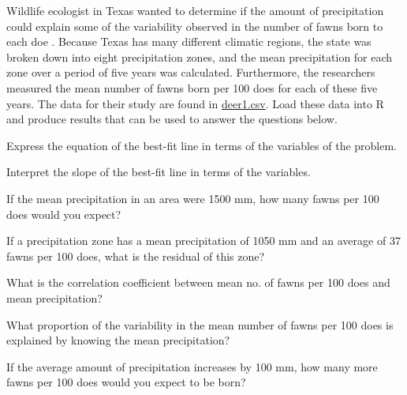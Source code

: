 \documentclass[10pt,openany]{book}\usepackage[]{graphicx}\usepackage[]{color}
\begin{document}
\begin{exsection}
  \item \label{revex:RegFawns} \rhw{} Wildlife ecologist in Texas wanted to determine if the amount of precipitation could explain some of the variability observed in the number of fawns born to each doe \citep{GinnettYoung2000}.  Because Texas has many different climatic regions, the state was broken down into eight precipitation zones, and the mean precipitation for each zone over a period of five years was calculated.  Furthermore, the researchers measured the mean number of fawns born per 100 does for each of these five years.  The data for their study are found in \href{https://raw.githubusercontent.com/droglenc/NCData/master/Deer1.csv}{deer1.csv}.  Load these data into R and produce results that can be used to answer the questions below.  
    \begin{Enumerate}
      \item Express the equation of the best-fit line in terms of the variables of the problem.
      \item Interpret the slope of the best-fit line in terms of the variables.
      \item If the mean precipitation in an area were 1500 mm, how many fawns per 100 does would you expect?
      \item If a precipitation zone has a mean precipitation of 1050 mm and an average of 37 fawns per 100 does, what is the residual of this zone?
      \item What is the correlation coefficient between mean no. of fawns per 100 does and mean precipitation?
      \item What proportion of the variability in the mean number of fawns per 100 does is explained by knowing the mean precipitation?
      \item If the average amount of precipitation increases by 100 mm, how many more fawns per 100 does would you expect to be born?
    \end{Enumerate}


\end{exsection}
\end{document}

